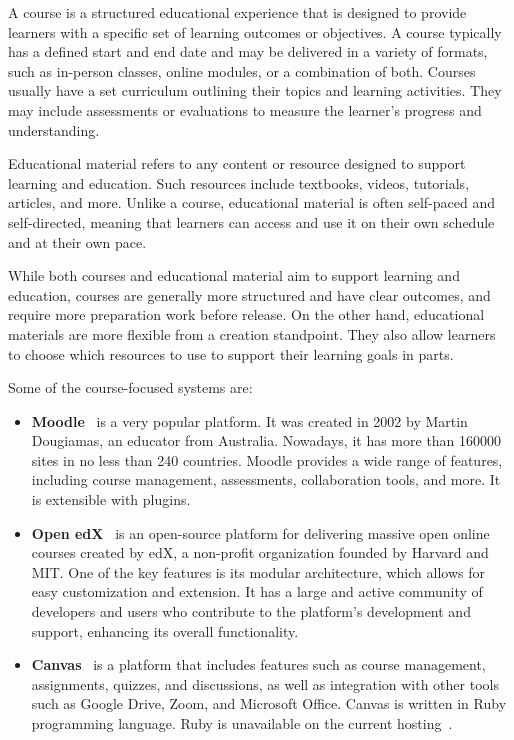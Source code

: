 \documentclass[
  digital,     %
  oneside,     %
  nosansbold,  %
  colorbold, %
  lof,         %
  lot,         %
]{fithesis4}
\begin{document}
A course is a structured educational experience that is designed to provide learners with a specific set of learning outcomes or objectives. A course typically has a defined start and end date and may be delivered in a variety of formats, such as in-person classes, online modules, or a combination of both. Courses usually have a set curriculum outlining their topics and learning activities. They may include assessments or evaluations to measure the learner's progress and understanding.

Educational material refers to any content or resource designed to support learning and education. Such resources include textbooks, videos, tutorials, articles, and more. Unlike a course, educational material is often self-paced and self-directed, meaning that learners can access and use it on their own schedule and at their own pace.

While both courses and educational material aim to support learning and education, courses are generally more structured and have clear outcomes, and require more preparation work before release. On the other hand, educational materials are more flexible from a creation standpoint. They also allow learners to choose which resources to use to support their learning goals in parts.

Some of the course-focused systems are:
\begin{itemize}

	\item \textbf{Moodle}~\cite{https://moodle.org/} is a very popular platform. It was created in 2002 by Martin Dougiamas, an educator from Australia. Nowadays, it has more than 160000 sites in no less than 240 countries. Moodle provides a wide range of features, including course management, assessments, collaboration tools, and more. It is extensible with plugins.

	\item \textbf{Open edX}~\cite{https://openedx.org/} is an open-source platform for delivering massive open online courses created by edX, a non-profit organization founded by Harvard and MIT. One of the key features is its modular architecture, which allows for easy customization and extension. It has a large and active community of developers and users who contribute to the platform's development and support, enhancing its overall functionality.

	\item \textbf{Canvas}~\cite{https://github.com/instructure/canvas-lms} is a platform that includes features such as course management, assignments, quizzes, and discussions, as well as integration with other tools such as Google Drive, Zoom, and Microsoft Office. Canvas is written in Ruby programming language. Ruby is unavailable on the current hosting~\cite{https://w3techs.com/sites/info/forpsi.com}.

\end{itemize}
\end{document}
